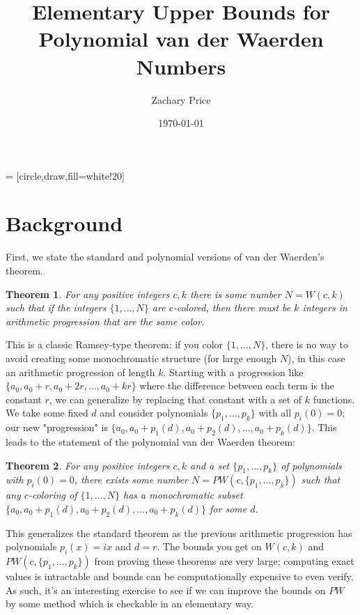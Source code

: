 \documentclass[a4paper]{amsproc}
\title{Elementary Upper Bounds for Polynomial van der Waerden Numbers}
\author[Price]{Zachary Price}
\date{\today}
\theoremstyle{plain}
\newtheorem{thm}{Theorem}[section]
\begin{document}
 = [circle,draw,fill=white!20]

\vspace{18mm} \setcounter{page}{1} \thispagestyle{empty}

\begin{abstract}

\end{abstract}

\maketitle

\section{Background}

First, we state the standard and polynomial versions of van der Waerden's theorem.

\begin{thm}
  For any positive integers $c,k$ there is some number $N=W(c,k)$ such that if the integers $\{1,\ldots,N\}$ are $c$-colored, then there must be $k$ integers in arithmetic progression that are the same color.
\end{thm}

This is a classic Ramsey-type theorem: if you color $\{1,\ldots,N\}$, there is no way to avoid creating some monochromatic structure (for large enough $N$), in this case an arithmetic progression of length $k$.
Starting with a progression like $\{a_0, a_0+r, a_0+2r,\ldots, a_0+kr\}$ where the difference between each term is the constant $r$, we can generalize by replacing that constant with a set of $k$ functions.
We take some fixed $d$ and consider polynomials $\{p_1,\ldots,p_k\}$ with all $p_i(0)=0$; our new "progression" is $\{a_0, a_0+p_1(d), a_0+p_2(d),\ldots, a_0+p_k(d)\}$.
This leads to the statement of the polynomial van der Waerden theorem:

\begin{thm}
  For any positive integers $c,k$ and a set $\{p_1,\ldots,p_k\}$ of polynomials with $p_i(0)=0$, there exists some number $N=PW(c,\{p_1,\ldots,p_k\})$ such that any $c$-coloring of $\{1,\ldots,N\}$ has a monochromatic subset $\{a_0, a_0+p_1(d), a_0+p_2(d),\ldots, a_0+p_k(d)\}$ for some $d$.
\end{thm}

This generalizes the standard theorem as the previous arithmetic progression has polynomials $p_i(x) = ix$ and $d=r$.
The bounds you get on $W(c,k)$ and $PW(c,\{p_1,\ldots,p_k\})$ from proving these theorems are very large; computing exact values is intractable and bounds can be computationally expensive to even verify.
As such, it's an interesting exercise to see if we can improve the bounds on $PW$ by some method which is checkable in an elementary way.
\end{document}
